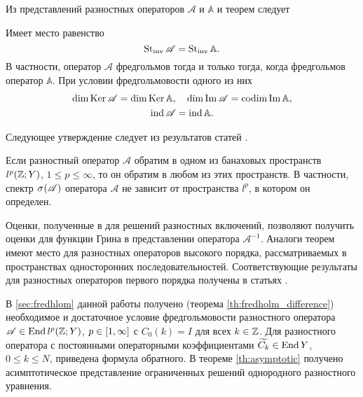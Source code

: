 Из представлений  разностных операторов $\mathcal A$ и $\mathbb A$ и теорем  следует
\begin{theorem}\label{th:stinvdiff}
    Имеет место равенство
    \[ \operatorname{St_{inv}} \mathcal A = \operatorname{St_{inv}} \mathbb A. \]
    В частности, оператор $\mathcal A$ фредгольмов тогда и только тогда, когда фредгольмов оператор $\mathbb A$. При условии фредгольмовости одного из них
    \begin{gather*}
    \dim \operatorname{Ker} \mathcal A = \dim \operatorname{Ker} \mathbb A, \quad \dim \operatorname{Im} \mathcal A = \operatorname{codim} \operatorname{Im} \mathbb A, \\
    \operatorname{ind} \mathcal A = \operatorname{ind} \mathbb A.
    \end{gather*}
\end{theorem}

Следующее утверждение следует из результатов статей \cite{inverse1992,memory2014}.
\begin{theorem}\label{th:inverseall}
    Если разностный оператор $\mathcal A$ обратим в одном из банаховых пространств $l^p(\mathbb{Z}; Y)$, $1 \leq p \leq \infty$, то он обратим в любом из этих пространств. В частности, спектр $\spectrum{\mathcal{A}}$ оператора $\mathcal A$ не зависит от пространства $l^p$, в котором он определен.
\end{theorem}

Оценки, полученные в \cite{green2015} для решений разностных включений, позволяют получить оценки для функции Грина в представлении оператора $\mathcal A^{-1}$. Аналоги теорем  имеют место для разностных операторов высокого порядка, рассматриваемых в пространствах односторонних последовательностей. Соответствующие результаты для разностных операторов первого порядка получены в статьях \cite{inverse1992,Bas13}.

В \textsection \ref{sec:fredhlom} данной работы получено (теорема \ref{th:fredholm_difference}) необходимое и достаточное условие фредгольмовости разностного оператора $\mathcal A \in \operatorname{End} l^p(\mathbb{Z}; Y)$, $p \hm\in [1, \infty]$ с $C_0(k) = I$ для всех $k \in \mathbb{Z}$. Для разностного оператора с постоянными операторными коэффициентами $\widetilde{C_k} \in \operatorname{End} Y$, $0 \leq k \leq N$, приведена формула обратного. В теореме \ref{th:asymptotic} получено асимптотическое представление ограниченных решений однородного разностного уравнения.
